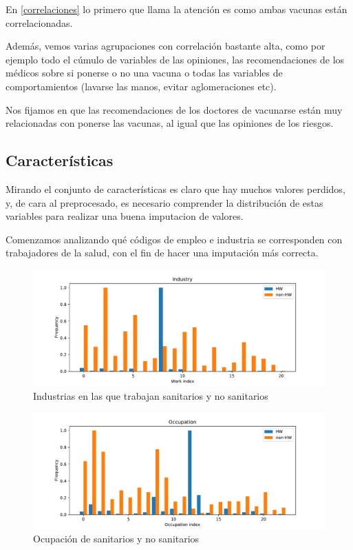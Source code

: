 \documentclass[twoside,openright,titlepage,numbers=noenddot,openany,headinclude,footinclude=true,
cleardoublepage=empty,abstractoff,BCOR=5mm,paper=a4,fontsize=12pt,main=spanish]{scrreprt}
\begin{document}
En \eqref{correlaciones} lo primero que llama la atención es como ambas vacunas están correlacionadas.

Además, vemos varias agrupaciones con correlación bastante alta, como por ejemplo todo el cúmulo de variables de las opiniones, las recomendaciones de los médicos sobre si ponerse o no una vacuna o todas las variables de comportamientos (lavarse las manos, evitar aglomeraciones etc).

Nos fijamos en que las recomendaciones de los doctores de vacunarse están muy relacionadas con ponerse las vacunas, al igual que las opiniones de los riesgos.

\subsection{Características}

Mirando el conjunto de características es claro que hay muchos valores perdidos, y, de cara al preprocesado, es necesario comprender la distribución de estas variables para realizar una buena imputacion de valores.

Comenzamos analizando qué códigos de empleo e industria se corresponden con trabajadores de la salud, con el fin de hacer una imputación más correcta.

\begin{figure}[H]
\includegraphics[scale=0.5]{industry.pdf}
\caption{Industrias en las que trabajan sanitarios y no sanitarios}
\label{industry}
\end{figure}

\begin{figure}[H]
\includegraphics[scale=0.5]{occupation.pdf}
\caption{Ocupación de sanitarios y no sanitarios}
\label{occupation}
\end{figure}
\end{document}
